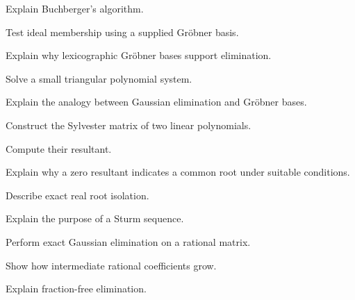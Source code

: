 \begin{exercise}[3]
Explain Buchberger's algorithm.
\end{exercise}

\begin{exercise}[3]
Test ideal membership using a supplied Gröbner basis.
\end{exercise}

\begin{exercise}[3]
Explain why lexicographic Gröbner bases support elimination.
\end{exercise}

\begin{exercise}[3]
Solve a small triangular polynomial system.
\end{exercise}

\begin{exercise}[3]
Explain the analogy between Gaussian elimination and Gröbner bases.
\end{exercise}

\begin{exercise}[2]
Construct the Sylvester matrix of two linear polynomials.
\end{exercise}

\begin{exercise}[3]
Compute their resultant.
\end{exercise}

\begin{exercise}[3]
Explain why a zero resultant indicates a common root under suitable
conditions.
\end{exercise}

\begin{exercise}[3]
Describe exact real root isolation.
\end{exercise}

\begin{exercise}[3]
Explain the purpose of a Sturm sequence.
\end{exercise}

\begin{exercise}[2]
Perform exact Gaussian elimination on a rational matrix.
\end{exercise}

\begin{exercise}[3]
Show how intermediate rational coefficients grow.
\end{exercise}

\begin{exercise}[3]
Explain fraction-free elimination.
\end{exercise}

